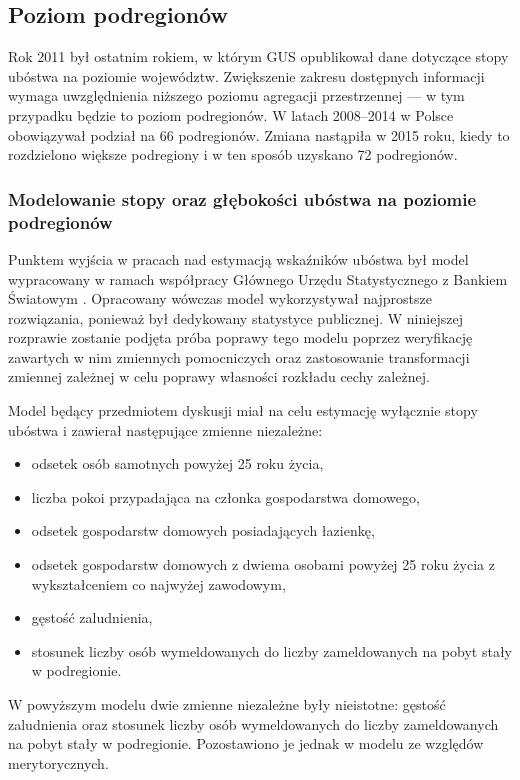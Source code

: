 \subsection{Poziom podregionów}

Rok 2011 był ostatnim rokiem, w którym GUS opublikował dane dotyczące stopy ubóstwa na poziomie województw. Zwiększenie zakresu dostępnych informacji wymaga uwzględnienia niższego poziomu agregacji przestrzennej --- w tym przypadku będzie to poziom podregionów. W latach 2008--2014 w Polsce obowiązywał podział na 66 podregionów. Zmiana nastąpiła w 2015 roku, kiedy to rozdzielono większe podregiony i w ten sposób uzyskano 72 podregionów.

\subsubsection{Modelowanie stopy oraz głębokości ubóstwa na poziomie podregionów}\label{pr:model-podreg}

Punktem wyjścia w pracach nad estymacją wskaźników ubóstwa był model wypracowany w ramach współpracy Głównego Urzędu Statystycznego z Bankiem Światowym \citep{mapowanie2014,wawrowski2014}. Opracowany wówczas model wykorzystywał najprostsze rozwiązania, ponieważ był dedykowany statystyce publicznej. W niniejszej rozprawie zostanie podjęta próba poprawy tego modelu poprzez weryfikację zawartych w nim zmiennych pomocniczych oraz zastosowanie transformacji zmiennej zależnej w celu poprawy własności rozkładu cechy zależnej.

Model będący przedmiotem dyskusji miał na celu estymację wyłącznie stopy ubóstwa i zawierał następujące zmienne niezależne:

\begin{itemize}
\item odsetek osób samotnych powyżej 25 roku życia,
\item liczba pokoi przypadająca na członka gospodarstwa domowego,
\item odsetek gospodarstw domowych posiadających łazienkę,
\item odsetek gospodarstw domowych z dwiema osobami powyżej 25 roku życia z wykształceniem co najwyżej zawodowym,
\item gęstość zaludnienia,
\item stosunek liczby osób wymeldowanych do liczby zameldowanych na pobyt stały w podregionie.
\end{itemize}

W powyższym modelu dwie zmienne niezależne były nieistotne: gęstość zaludnienia oraz stosunek liczby osób wymeldowanych do liczby zameldowanych na pobyt stały w podregionie. Pozostawiono je jednak w modelu ze względów merytorycznych.

